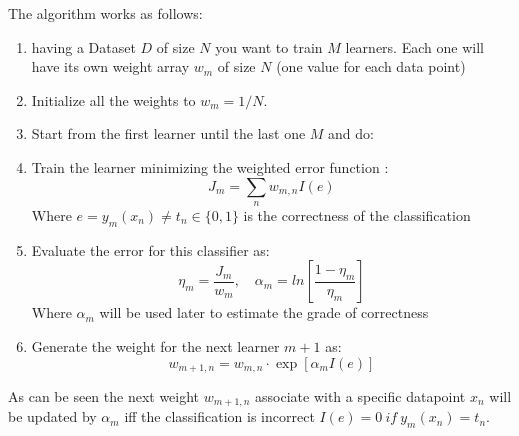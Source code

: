  The algorithm works as follows:
\begin{enumerate}
\item having a Dataset $D$ of size $N$ you want to train $M$ learners. Each one will have its own weight array $w_m$ of size $N$ (one value for each data point)
\item Initialize all the weights to  $w_m=1/N$.
\item Start from the first learner until the last one $M$ and do:
\item Train the learner minimizing the weighted error function :
$$J_m=\sum_n w_{m,n}I(e)$$
Where $e=y_m(x_n) \ne t_n \in \{0,1\}$ is the correctness of the classification
\item Evaluate the error for this classifier as:
$$\eta_m=\frac{J_m}{w_m},\quad \alpha_m=ln[\frac{1-\eta_m}{\eta_m}]$$
Where $\alpha_m$ will be used later to estimate the grade of correctness

\item Generate the weight for the next learner $m+1$ as:
$$w_{m+1,n}=w_{m,n}\cdot \exp[\alpha_m I(e)]$$
\end{enumerate}
As can be seen the next weight $w_{m+1,n}$ associate with a specific datapoint $x_n$ will be updated by $\alpha_m$ iff the classification is incorrect $ I(e)=0\ if\ y_m(x_n) = t_n$.